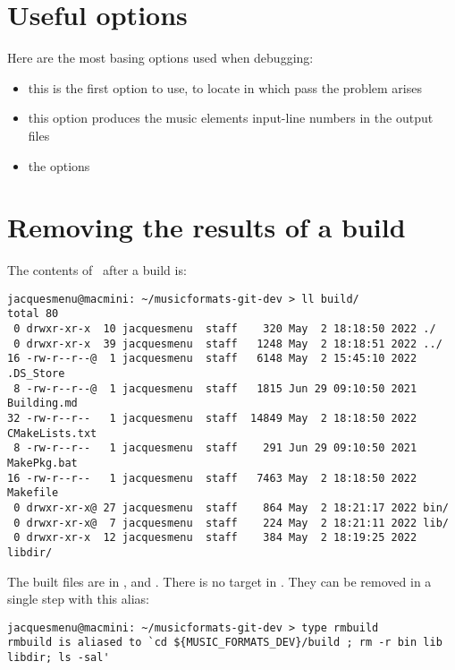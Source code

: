 \section{Useful options}

Here are the most basing options used when debugging:
\begin{itemize}
\item {}
	this is the first option to use, to locate in which pass the problem arises

\item {}
	this option produces the music elements input-line numbers in the output files

\item the  options

\end{itemize}


\section{Removing the results of a build}

The contents of \distrib\ after a build is:
\begin{lstlisting}[language=Terminal]
jacquesmenu@macmini: ~/musicformats-git-dev > ll build/
total 80
 0 drwxr-xr-x  10 jacquesmenu  staff    320 May  2 18:18:50 2022 ./
 0 drwxr-xr-x  39 jacquesmenu  staff   1248 May  2 18:18:51 2022 ../
16 -rw-r--r--@  1 jacquesmenu  staff   6148 May  2 15:45:10 2022 .DS_Store
 8 -rw-r--r--@  1 jacquesmenu  staff   1815 Jun 29 09:10:50 2021 Building.md
32 -rw-r--r--   1 jacquesmenu  staff  14849 May  2 18:18:50 2022 CMakeLists.txt
 8 -rw-r--r--   1 jacquesmenu  staff    291 Jun 29 09:10:50 2021 MakePkg.bat
16 -rw-r--r--   1 jacquesmenu  staff   7463 May  2 18:18:50 2022 Makefile
 0 drwxr-xr-x@ 27 jacquesmenu  staff    864 May  2 18:21:17 2022 bin/
 0 drwxr-xr-x@  7 jacquesmenu  staff    224 May  2 18:21:11 2022 lib/
 0 drwxr-xr-x  12 jacquesmenu  staff    384 May  2 18:19:25 2022 libdir/
\end{lstlisting}

The built files are in ,  and . There is no  target in \Makefile. They can be removed in a single step with this alias:
\begin{lstlisting}[language=Terminal]
jacquesmenu@macmini: ~/musicformats-git-dev > type rmbuild
rmbuild is aliased to `cd ${MUSIC_FORMATS_DEV}/build ; rm -r bin lib libdir; ls -sal'
\end{lstlisting}


